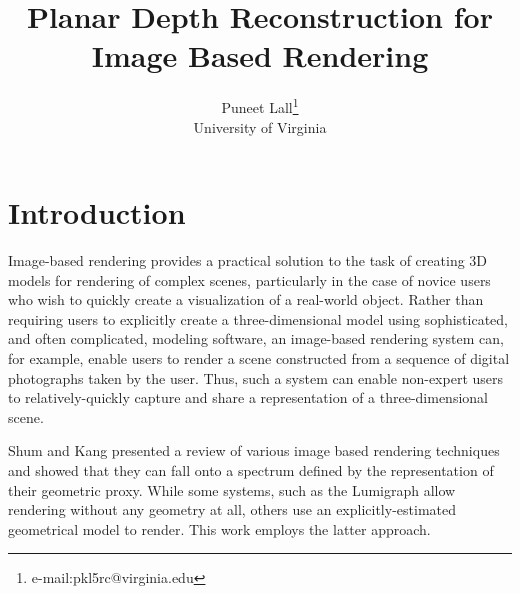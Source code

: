 \documentclass[conference]{acmsiggraph}
\title{Planar Depth Reconstruction for Image Based Rendering}
\author{Puneet Lall\thanks{e-mail:pkl5rc@virginia.edu}\\University of Virginia}
\begin{document}

\maketitle










\section{Introduction}

Image-based rendering provides a practical solution to the task of creating
3D models for rendering of complex scenes, particularly in the case of
novice users who wish to quickly create a visualization of a real-world object.
Rather than requiring users to explicitly create a three-dimensional model using
sophisticated, and often complicated, modeling software, an image-based rendering
system can, for example, 
enable users to render a scene constructed from a sequence of
digital photographs taken by the user.  Thus, such a system can enable
non-expert users to relatively-quickly capture and share a representation of
a three-dimensional scene.
 
Shum and Kang  presented a review of various image based
rendering techniques and showed that they can fall onto a spectrum defined
by the representation of their geometric proxy.  While some systems,
such as the Lumigraph \cite{gortler1996lumigraph} allow rendering without
any geometry at all, others use an explicitly-estimated geometrical model
to render.  This work employs the latter approach.
\end{document}
